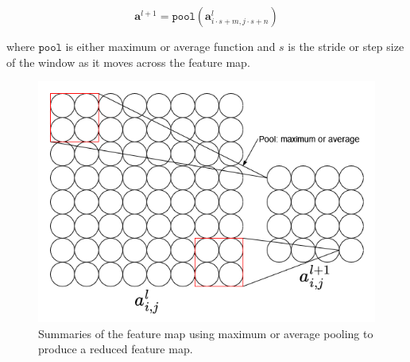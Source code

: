 \documentclass[preprint,12pt]{elsarticle}
\begin{document}
\begin{equation}
\mathbf{a}^{l+1}=\texttt{pool}(\mathbf{a}^l_{i\cdot s+m,j\cdot s+n})
\end{equation}

\noindent where $\texttt{pool}$ is either maximum or average function and $s$ is the stride or step size of the window as it moves across the feature map.

\begin{figure}[h!]
\centering
\includegraphics[scale=0.4]{fig_layers_pooling.png}
\caption{Summaries of the feature map using maximum or average pooling to produce a reduced feature map.}
\label{fig_layers_pooling}
\end{figure}
\end{document}

